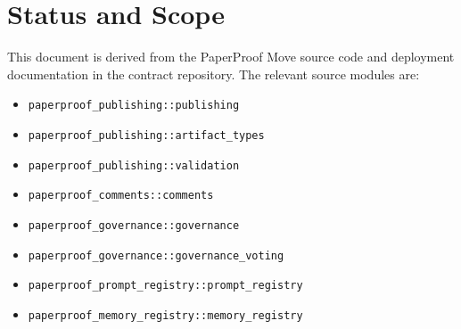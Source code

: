 \documentclass[11pt]{article}
\newcommand{\code}[1]{\texttt{#1}}
\begin{document}
\begin{abstract}
PaperProof is a Sui-native protocol for durable, verifiable, and community-governed digital artifacts. This yellow paper specifies the current contract-level protocol as implemented by the PaperProof mainnet packages. It describes the trust roots, deployment manifest, object inventory, artifact type registry, artifact series model, typed version records, Walrus content references, comments tree, likes book, fee manager, governance vault, proposals, voting, claims, events, validation rules, error codes, indexing rules, upgrade boundaries, and SDK-facing contracts.

This document is intentionally narrower than a whitepaper and stricter than an application guide. It does not claim that PaperProof proves truth, originality, academic quality, license compliance, or social value. It specifies what the protocol recognizes, what the contracts store, what events can be treated as canonical under the active deployment, and how third-party applications and indexers should avoid common integration errors.
\end{abstract}

\tableofcontents
\newpage

\section{Status and Scope}

This document is derived from the PaperProof Move source code and deployment documentation in the contract repository. The relevant source modules are:

\begin{itemize}[leftmargin=*]
  \item \code{paperproof\_publishing::publishing}
  \item \code{paperproof\_publishing::artifact\_types}
  \item \code{paperproof\_publishing::validation}
  \item \code{paperproof\_comments::comments}
  \item \code{paperproof\_governance::governance}
  \item \code{paperproof\_governance::governance\_voting}
  \item \code{paperproof\_prompt\_registry::prompt\_registry}
  \item \code{paperproof\_memory\_registry::memory\_registry}
\end{itemize}
\end{document}
